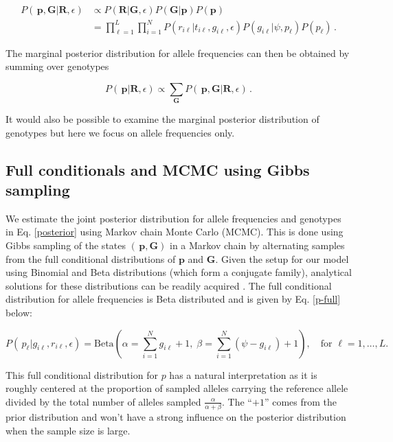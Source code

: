 \documentclass[11pt,english,letterpaper,oneside]{article}
\begin{document}
\begin{align}\label{posterior}
P(\,\bm{p},\bm{G}|\bm{R},\epsilon) &\propto P(\bm{R}|\bm{G}, \epsilon)P(\bm{G}|\bm{p})P(\bm{p}) \nonumber \\[0.05in]
&= \displaystyle\prod_{\ell=1}^L\displaystyle\prod_{i=1}^N P(r_{i \ell}|t_{i\ell}, g_{i \ell},\epsilon)P(g_{i \ell}|\psi, p_{\ell})P(p_{\ell})\,.
\end{align}

\noindent The marginal posterior distribution for allele frequencies can then be obtained by summing over genotypes

\begin{equation}\label{marg_post_p}
P(\,\bm{p}|\bm{R},\epsilon) \propto \displaystyle\sum_{\bm{G}} P(\,\bm{p},\bm{G}|\bm{R},\epsilon)\,.
\end{equation}

\noindent It would also be possible to examine the marginal posterior distribution of genotypes but here we focus on allele frequencies only.

\medskip
\subsection*{Full conditionals and MCMC using Gibbs sampling}
\medskip

\noindent We estimate the joint posterior distribution for allele frequencies and genotypes in Eq. \ref{posterior} using Markov chain Monte Carlo (MCMC). This is done using Gibbs sampling of the states $(\,\bm{p},\bm{G})$ in a Markov chain by alternating samples from the full conditional distributions of $\bm{p}$ and $\bm{G}$. Given the setup for our model using Binomial and Beta distributions (which form a conjugate family), analytical solutions for these distributions can be readily acquired \citep{gelman2014bayesian}. The full conditional distribution for allele frequencies is Beta distributed and is given by Eq. \ref{p-full} below:

\begin{equation}\label{p-full}
P(\,p_{\ell}|g_{i \ell},r_{i \ell},\epsilon) = \text{Beta}\left(\alpha= \sum_{i=1}^N g_{i \ell} +1,\; \beta = \sum_{i=1}^N (\psi-g_{i \ell})+1\right),\quad \text{for } \ell = 1,\ldots,L.
\end{equation}

\noindent This full conditional distribution for $p$ has a natural interpretation as it is roughly centered at the proportion of sampled alleles carrying the reference allele divided by the total number of alleles sampled $\frac{\alpha}{\alpha+\beta}$. The ``$+1$'' comes from the prior distribution and won't have a strong influence on the posterior distribution when the sample size is large.
\end{document}
